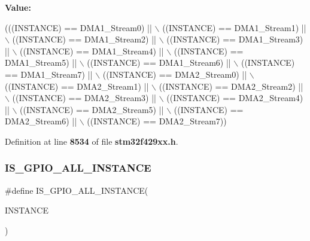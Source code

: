 {\bfseries Value\+:}
\begin{DoxyCode}
(((INSTANCE) == DMA1_Stream0) || \(\backslash\)
                                              ((INSTANCE) == DMA1_Stream1) || \(\backslash\)
                                              ((INSTANCE) == DMA1_Stream2) || \(\backslash\)
                                              ((INSTANCE) == DMA1_Stream3) || \(\backslash\)
                                              ((INSTANCE) == DMA1_Stream4) || \(\backslash\)
                                              ((INSTANCE) == DMA1_Stream5) || \(\backslash\)
                                              ((INSTANCE) == DMA1_Stream6) || \(\backslash\)
                                              ((INSTANCE) == DMA1_Stream7) || \(\backslash\)
                                              ((INSTANCE) == DMA2_Stream0) || \(\backslash\)
                                              ((INSTANCE) == DMA2_Stream1) || \(\backslash\)
                                              ((INSTANCE) == DMA2_Stream2) || \(\backslash\)
                                              ((INSTANCE) == DMA2_Stream3) || \(\backslash\)
                                              ((INSTANCE) == DMA2_Stream4) || \(\backslash\)
                                              ((INSTANCE) == DMA2_Stream5) || \(\backslash\)
                                              ((INSTANCE) == DMA2_Stream6) || \(\backslash\)
                                              ((INSTANCE) == DMA2_Stream7))
\end{DoxyCode}


Definition at line \textbf{ 8534} of file \textbf{ stm32f429xx.\+h}.

\mbox{\label{group__Exported__macros_ga783626dd2431afebea836a102e318957}} 
\subsubsection{I\+S\+\_\+\+G\+P\+I\+O\+\_\+\+A\+L\+L\+\_\+\+I\+N\+S\+T\+A\+N\+CE}
{\footnotesize\ttfamily \#define I\+S\+\_\+\+G\+P\+I\+O\+\_\+\+A\+L\+L\+\_\+\+I\+N\+S\+T\+A\+N\+CE(\begin{DoxyParamCaption}\item[{}]{I\+N\+S\+T\+A\+N\+CE }\end{DoxyParamCaption})}

